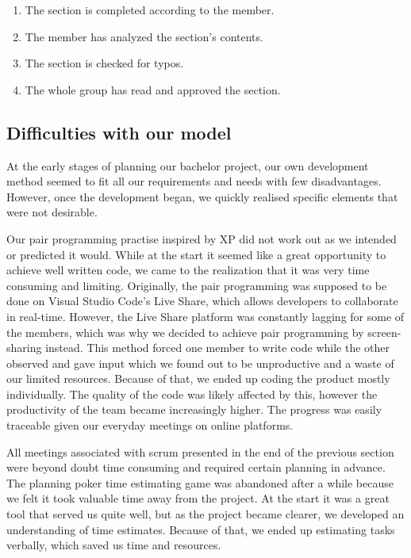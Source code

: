 \begin{enumerate}
    \item The section is completed according to the member.
    \item The member has analyzed the section's contents.
    \item The section is checked for typos.
    \item The whole group has read and approved the section.
\end{enumerate}

\subsection{Difficulties with our model}
At the early stages of planning our bachelor project, our own development method seemed to fit all our requirements and needs with few disadvantages. However, once the development began, we quickly realised specific elements that were not desirable. 

Our pair programming practise inspired by XP did not work out as we intended or predicted it would. While at the start it seemed like a great opportunity to achieve well written code, we came to the realization that it was very time consuming and limiting. Originally, the pair programming was supposed to be done on Visual Studio Code's Live Share, which allows developers to collaborate in real-time. However, the Live Share platform was constantly lagging for some of the members, which was why we decided to achieve pair programming by screen-sharing instead. This method forced one member to write code while the other observed and gave input which we found out to be unproductive and a waste of our limited resources. Because of that, we ended up coding the product mostly individually. The quality of the code was likely affected by this, however the productivity of the team became increasingly higher. The progress was easily traceable given our everyday meetings on online platforms.   

All meetings associated with scrum presented in the end of the previous section were beyond doubt time consuming and required certain planning in advance. The planning poker time estimating game was abandoned after a while because we felt it took valuable time away from the project. At the start it was a great tool that served us quite well, but as the project became clearer, we developed an understanding of time estimates. Because of that, we ended up estimating tasks verbally, which saved us time and resources.  

